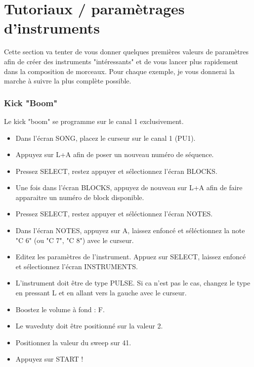 \documentclass[12pt,a4paper]{article}
\begin{document}
  \section{Tutoriaux / paramètrages d'instruments}
  
  Cette section va tenter de vous donner quelques premières valeurs de paramètres afin de créer des instruments "intéressants" et de vous lancer plus rapidement dans la composition de morceaux. Pour chaque exemple, je vous donnerai la marche à suivre la plus complète possible.
  
    \subsubsection{Kick "Boom"}
    
    Le kick "boom" se programme sur le canal 1 exclusivement.    
    
    \begin{itemize}
    \item{Dans l'écran SONG, placez le curseur sur le canal 1 (PU1).}    
    \item{Appuyez sur L+A afin de poser un nouveau numéro de séquence.}
    \item{Pressez SELECT, restez appuyer et sélectionnez l'écran BLOCKS.}
    \item{Une fois dans l'écran BLOCKS, appuyez de nouveau sur L+A afin de faire apparaitre un numéro de block disponible.}
    \item{Pressez SELECT, restez appuyer et séléctionnez l'écran NOTES.}
    \item{Dans l'écran NOTES, appuyez sur A, laissez enfoncé et séléctionnez la note "C 6" (ou "C 7", "C 8") avec le curseur.}
    \item{Editez les paramètres de l'instrument. Appuez sur SELECT, laissez enfoncé et sélectionnez l'écran INSTRUMENTS.}
    \item{L'instrument doit être de type PULSE. Si ca n'est pas le cas, changez le type en pressant L et en allant vers la gauche avec le curseur.}
    \item{Boostez le volume à fond : F.}
    \item{Le waveduty doit être positionné sur la valeur 2.}
    \item{Positionnez la valeur du sweep sur 41.}
    \item{Appuyez sur START !}
    \end{itemize}\medskip
    
\end{document}
